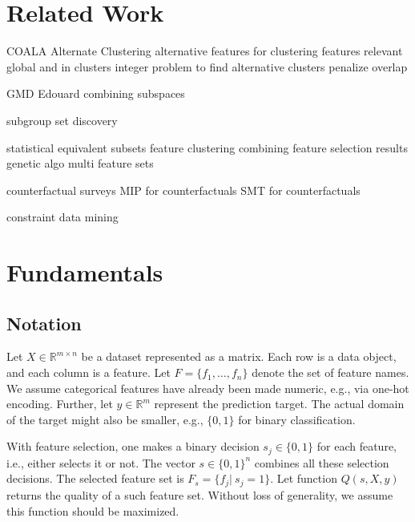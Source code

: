 \documentclass{article}
\theoremstyle{definition}
\begin{document}
\section{Related Work}
\label{sec:related-work}

COALA \cite{bae2006coala}
Alternate Clustering \cite{bailey2014alternative}
alternative features for clustering \cite{tao2012novel}
features relevant global and in clusters \cite{guan2011unified}
integer problem to find alternative clusters \cite{bae2010clustering}
penalize overlap \cite{mueller2009relevant}

GMD \cite{trittenbach2019dimension}
Edouard \cite{fouche2021efficient}
combining subspaces \cite{nguyen20134s}

subgroup set discovery \cite{leeuwen2012diverse}

statistical equivalent subsets \cite{lagani2017feature, borboudakis2021extending, tsamardinos2003towards, dougherty2006number}
feature clustering \cite{mueller2021feature}
combining feature selection results \cite{woznica2012model}
genetic algo multi feature sets \cite{siddiqi2020genetic}

counterfactual surveys \cite{verma2020counterfactual, stepin2021survey}
MIP for counterfactuals \cite{mohammadi2021scaling}
SMT for counterfactuals \cite{karimi2020model}

constraint data mining \cite{grossi2017survey}

\section{Fundamentals}
\label{sec:fundamentals}

\subsection{Notation}

Let $X \in \mathbb{R}^{m \times n}$ be a dataset represented as a matrix.
Each row is a data object, and each column is a feature.
Let $F = \{f_1, \dots, f_n\}$ denote the set of feature names.
We assume categorical features have already been made numeric, e.g., via one-hot encoding.
Further, let $y \in \mathbb{R}^m$ represent the prediction target.
The actual domain of the target might also be smaller, e.g., $\{0,1\}$ for binary classification.

With feature selection, one makes a binary decision $s_j \in \{0,1\}$ for each feature, i.e., either selects it or not.
The vector $s \in \{0,1\}^n$ combines all these selection decisions.
The selected feature set is $F_s = \{f_j|~s_j=1\}$.
Let function $Q(s,X,y)$ returns the quality of a such feature set.
Without loss of generality, we assume this function should be maximized.
\end{document}
